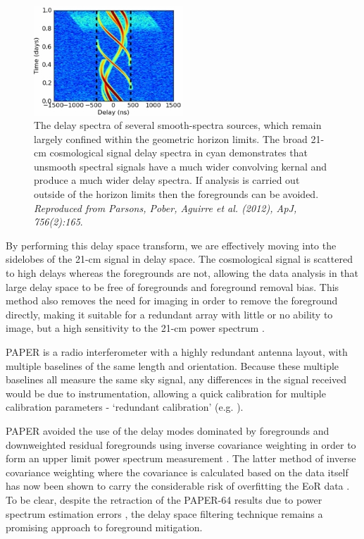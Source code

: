 \begin{figure}
\begin{center}
    \includegraphics[width=0.5\textwidth]{Chapman_Jelic/Images/horizon.jpg}
\end{center}
    \caption{The delay spectra of several smooth-spectra sources, which remain largely confined within the geometric horizon limits. The broad 21-cm cosmological signal delay spectra in cyan demonstrates that unsmooth spectral signals have a much wider convolving kernal and produce a much wider delay spectra. If analysis is carried out outside of the horizon limits then the foregrounds can be avoided. \textit{Reproduced from Parsons, Pober, Aguirre et al. (2012), ApJ, 756(2):165}.}
    \label{fig:horizon}
\end{figure}

By performing this delay space transform, we are effectively moving into the sidelobes of the 21-cm signal in delay space. The cosmological signal is scattered to high delays whereas the foregrounds are not, allowing the data analysis in that large delay space to be free of foregrounds and foreground removal bias. This method also removes the need for imaging in order to remove the foreground directly, making it suitable for a redundant array with little or no ability to image, but a high sensitivity to the 21-cm power spectrum \cite{Parsons2012ApJ...753...81P}.   

PAPER is a radio interferometer with a highly redundant antenna layout, with multiple baselines of the same length and orientation. Because these multiple baselines all measure the same sky signal, any differences in the signal received would be due to instrumentation, allowing a quick calibration for multiple calibration parameters - `redundant calibration' (e.g. \cite{Ronniy2018AJ....156..285J,Li2018ApJ...863..170L,Dillon2016ApJ...826..181D,Zheng2014MNRAS.445.1084Z,Wieringa1992ExA.....2..203W}). 

PAPER avoided the use of the delay modes dominated by foregrounds and downweighted residual foregrounds using inverse covariance weighting in order to form an upper limit power spectrum measurement \cite{Ali2015ApJ...809...61A}. The latter method of inverse covariance weighting where the covariance is calculated based on the data itself has now been shown to carry the considerable risk of overfitting the EoR data \cite{Cheng2018ApJ...868...26C}. To be clear, despite the retraction of the PAPER-64 results due to power spectrum estimation errors \cite{Ali2018ApJ...863..201A}, the delay space filtering technique remains a promising approach to foreground mitigation.

